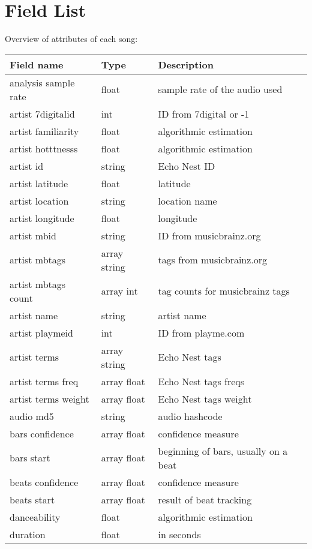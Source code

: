 \section{Field List} %
\label{sec:field_list}

Overview of attributes of each song:



\begin{longtable}[c]{l|l|l}
\textbf{Field name}     & \textbf{Type}   & \textbf{Description} \\
\hline
analysis sample rate & float & sample rate of the audio used\\
artist 7digitalid& int & ID from 7digital or -1 \\
artist familiarity & float & algorithmic estimation\\
artist hotttnesss & float & algorithmic estimation\\
artist id & string & Echo Nest ID\\
artist latitude & float & latitude\\
artist location & string & location name\\
artist longitude & float & longitude\\
artist mbid & string & ID from musicbrainz.org\\
artist mbtags & array string & tags from musicbrainz.org\\
artist mbtags count & array int & tag counts for musicbrainz tags\\
artist name & string & artist name\\
artist playmeid & int & ID from playme.com\\
artist terms & array string & Echo Nest tags\\
artist terms freq & array float & Echo Nest tags freqs\\
artist terms weight & array float & Echo Nest tags weight\\
audio md5 & string & audio hashcode\\
bars confidence & array float & confidence measure\\
bars start & array float & beginning of bars, usually on a beat\\
beats confidence & array float & confidence measure\\
beats start & array float & result of beat tracking\\
danceability & float & algorithmic estimation\\
duration & float & in seconds\\

\end{longtable}
